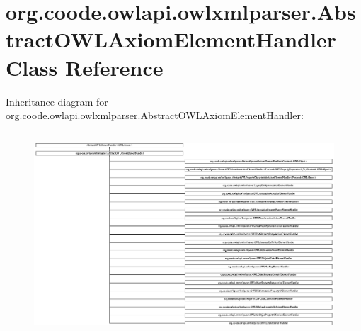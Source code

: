 \hypertarget{classorg_1_1coode_1_1owlapi_1_1owlxmlparser_1_1_abstract_o_w_l_axiom_element_handler}{\section{org.\-coode.\-owlapi.\-owlxmlparser.\-Abstract\-O\-W\-L\-Axiom\-Element\-Handler Class Reference}
\label{classorg_1_1coode_1_1owlapi_1_1owlxmlparser_1_1_abstract_o_w_l_axiom_element_handler}
}
Inheritance diagram for org.\-coode.\-owlapi.\-owlxmlparser.\-Abstract\-O\-W\-L\-Axiom\-Element\-Handler\-:\begin{figure}[H]
\begin{center}
\leavevmode
\includegraphics[height=7.630332cm]{classorg_1_1coode_1_1owlapi_1_1owlxmlparser_1_1_abstract_o_w_l_axiom_element_handler}
\end{center}
\end{figure}

